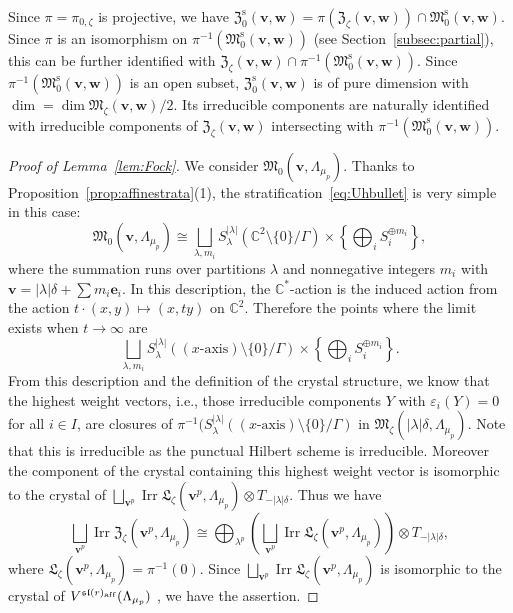 \documentclass[10pt,a4paper]{amsart}
\theoremstyle{definition}
\numberwithin{equation}{section}
\newcommand{\lemref}[1]{Lemma~\ref{#1}}
\newcommand{\propref}[1]{Proposition~\ref{#1}}
\newcommand{\subsecref}[1]{Section~\ref{#1}}
\newcommand{\C}{{\mathbb C}}
\newcommand{\algsl}{\operatorname{\mathfrak{sl}}} %
\newcommand{\M}{{\mathfrak M}} %
\newcommand{\Mreg}{\M^{\operatorname{s}}}
\newcommand{\La}{{\mathfrak L}} %
\newcommand{\bv}{{\mathbf v}} %
\newcommand{\bw}{{\mathbf w}} %
\newcommand{\be}{{\mathbf e}}
\newcommand{\Irr}{\operatorname{Irr}}
\newcommand{\aff}{\mathrm{af\/f}}
\begin{document}
Since $\pi = \pi_{0,\zeta}$ is projective, we have
$\mathfrak Z_0^{\operatorname{s}}(\bv,\bw)
= \pi(\mathfrak Z_\zeta(\bv,\bw))\cap\Mreg_0(\bv,\bw)$. Since $\pi$ is an
isomorphism on $\pi^{-1}(\Mreg_0(\bv,\bw))$ (see
\subsecref{subsec:partial}), this can be further identif\/ied with
$\mathfrak Z_\zeta(\bv,\bw)\cap\pi^{-1}(\Mreg_0(\bv,\bw))$. Since
$\pi^{-1}(\Mreg_0(\bv,\bw))$ is an open subset,
$\mathfrak Z_0^{\operatorname{s}}(\bv,\bw)$ is of pure dimension with
$\dim = \dim\M_\zeta(\bv,\bw)/2$. Its irreducible components are naturally
identif\/ied with irreducible components of
$\mathfrak Z_\zeta(\bv,\bw)$ intersecting with
$\pi^{-1}(\Mreg_0(\bv,\bw))$.

\begin{proof}[Proof of \lemref{lem:Fock}]
We consider $\M_0(\bv,\Lambda_{\mu_p})$. Thanks to
\propref{prop:affinestrata}(1), the stratif\/ica\-tion~\eqref{eq:Uhbullet}
is very simple in this case:
\begin{equation*}
  \M_0(\bv,\Lambda_{\mu_p}) \cong
  \bigsqcup_{\lambda,m_i} S^{|\lambda|}_\lambda (\C^2\setminus\{0\}/\Gamma)
  \times \left\{\bigoplus_i S_i^{\oplus m_i}\right\},
\end{equation*}
where the summation runs over partitions $\lambda$ and nonnegative
integers $m_i$ with $\bv = |\lambda|\delta + \sum m_i \be_i$. In this
description, the $\C^*$-action is the induced action from the action
$t\cdot(x,y)\mapsto (x,ty)$ on $\C^2$. Therefore the points
where the limit exists when $t\to\infty$ are
\begin{equation*}
  \bigsqcup_{\lambda,m_i} S^{|\lambda|}_\lambda
  ((\text{$x$-axis}) \setminus\{0\}/\Gamma)
  \times \left\{\bigoplus_i S_i^{\oplus m_i}\right\}.
\end{equation*}
From this description and the def\/inition of the crystal structure, we
know that the highest weight vectors, i.e., those irreducible
components $Y$ with $\varepsilon_i(Y) = 0$ for all $i\in I$, are
closures of $\pi^{-1}(S^{|\lambda|}_\lambda ((\text{$x$-axis})
\setminus\{0\}/\Gamma)$ in
$\M_\zeta(|\lambda|\delta,\Lambda_{\mu_p})$.
%
Note that this is irreducible as the punctual Hilbert scheme is
irreducible.
%
Moreover the component of the crystal containing this highest weight
vector is isomorphic to the crystal of $\bigsqcup_{\bv^p} \Irr
\La_\zeta(\bv^p,\Lambda_{\mu_p})\otimes T_{-|\lambda|\delta}$.
%
Thus we have
\begin{equation*}
   \bigsqcup_{\bv^p} \Irr\mathfrak Z_\zeta(\bv^p,\Lambda_{\mu_p})
   \cong \bigoplus_{\lambda^p}
   \left(\bigsqcup_{\bv^p} \Irr \La_\zeta(\bv^p,\Lambda_{\mu_p})\right)
   \otimes T_{-|\lambda|\delta},
\end{equation*}
where $\La_\zeta(\bv^p,\Lambda_{\mu_p}){=} \pi^{-1}(0)$.
%
Since $\bigsqcup_{\bv^p} \Irr \La_\zeta(\bv^p,\Lambda_{\mu_p})$ is
isomorphic to the crystal of $V^{\algsl(r)_\aff}(\Lambda_{\mu_p})$
\cite{KS,Saito,Na-tensor}, we have the assertion.
\end{proof}
\end{document}
